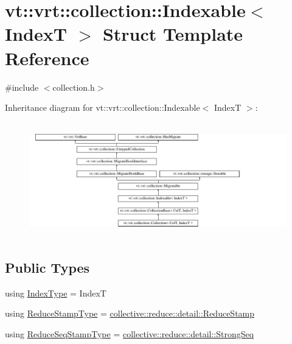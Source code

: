 \hypertarget{structvt_1_1vrt_1_1collection_1_1_indexable}{}\section{vt\+:\+:vrt\+:\+:collection\+:\+:Indexable$<$ IndexT $>$ Struct Template Reference}
\label{structvt_1_1vrt_1_1collection_1_1_indexable}


{\ttfamily \#include $<$collection.\+h$>$}

Inheritance diagram for vt\+:\+:vrt\+:\+:collection\+:\+:Indexable$<$ IndexT $>$\+:\begin{figure}[H]
\begin{center}
\leavevmode
\includegraphics[height=5.028059cm]{structvt_1_1vrt_1_1collection_1_1_indexable}
\end{center}
\end{figure}
\subsection*{Public Types}
\begin{DoxyCompactItemize}
\item 
using \hyperlink{structvt_1_1vrt_1_1collection_1_1_indexable_a448ea88cb04f689e0ff22241f21485c0}{Index\+Type} = IndexT
\item 
using \hyperlink{structvt_1_1vrt_1_1collection_1_1_indexable_a0369a8abcf13550caec736365f7fb30f}{Reduce\+Stamp\+Type} = \hyperlink{namespacevt_1_1collective_1_1reduce_1_1detail_abcd205dec83706f347d55c7528bf2664}{collective\+::reduce\+::detail\+::\+Reduce\+Stamp}
\item 
using \hyperlink{structvt_1_1vrt_1_1collection_1_1_indexable_af259d608ccabcbe13680763fe5f1c656}{Reduce\+Seq\+Stamp\+Type} = \hyperlink{namespacevt_1_1collective_1_1reduce_1_1detail_affec2854d7d65bafb17eb259714e9443}{collective\+::reduce\+::detail\+::\+Strong\+Seq}
\end{DoxyCompactItemize}
